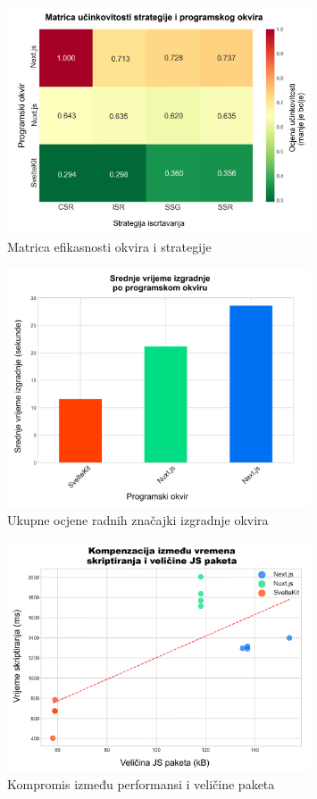 \begin{figure}[H]
    \centering
    \includegraphics[width=0.8\textwidth]{slike/rezultati/dodatne-metrike/framework_strategy_efficiency_matrix.png}
    \caption{Matrica efikasnosti okvira i strategije}
    \label{fig:framework_strategy_efficiency_matrix}
\end{figure}

\begin{figure}[H]
    \centering
    \includegraphics[width=0.8\textwidth]{slike/rezultati/dodatne-metrike/overall_framework_build_performance.png}
    \caption{Ukupne ocjene radnih značajki izgradnje okvira}
    \label{fig:overall_framework_build_performance}
\end{figure}

\begin{figure}[H]
    \centering
    \includegraphics[width=0.8\textwidth]{slike/rezultati/dodatne-metrike/performance_vs_bundle_size_tradeoff.png}
    \caption{Kompromis između performansi i veličine paketa}
    \label{fig:performance_vs_bundle_size_tradeoff}
\end{figure}
